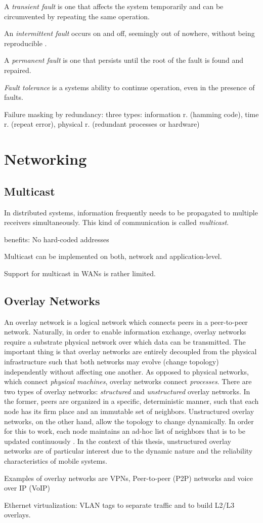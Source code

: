 A \emph{transient fault} is one that affects the system temporarily and can be circumvented by repeating the same operation.

An \emph{intermittent fault} occurs on and off, seemingly out of nowhere, without being reproducible .

A \emph{permanent fault} is one that persists until the root of the fault is found and repaired.

\emph{Fault tolerance} is a systems ability to continue operation, even in the presence of faults.

Failure masking by redundancy: three types: information r. (hamming code), time r. (repeat error), physical r. (redundant processes or hardware)




\section{Networking}

\subsection{Multicast}

In distributed systems, information frequently needs to be propagated to multiple receivers simultaneously. This kind of communication is called \emph{multicast}.

benefits: No hard-coded addresses

Multicast can be implemented on both, network and application-level.

Support for multicast in WANs is rather limited.



\subsection{Overlay Networks}

An overlay network is a logical network which connects peers in a peer-to-peer network. Naturally, in order to enable information exchange, overlay networks require a substrate physical network over which data can be transmitted. The important thing is that overlay networks are entirely decoupled from the physical infrastructure such that both networks may evolve (change topology) independently without affecting one another. As opposed to physical networks, which connect \emph{physical machines}, overlay networks connect \emph{processes}. There are two types of overlay networks: \emph{structured} and \emph{unstructured} overlay networks. In the former, peers are organized in a specific, deterministic manner, such that each node has its firm place and an immutable set of neighbors. Unstructured overlay networks, on the other hand, allow the topology to change dynamically. In order for this to work, each node maintains an ad-hoc list of neighbors that is to be updated continuously \cite{tanenbaum2017distributed}. In the context of this thesis, unstructured overlay networks are of particular interest due to the dynamic nature and the reliability characteristics of mobile systems.


Examples of overlay networks are VPNs, Peer-to-peer (P2P) networks and voice over IP (VoIP)

Ethernet virtualization: VLAN tags to separate traffic and to build L2/L3 overlays.



